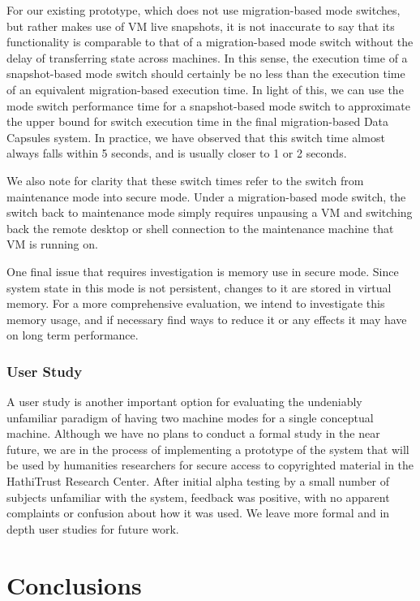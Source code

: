 \documentclass{acm_proc_article-sp}
\begin{document}
For our existing prototype, which does not use migration-based mode switches,
but rather makes use of VM live snapshots, it is not inaccurate to say that its
functionality is comparable to that of a migration-based mode switch without the
delay of transferring state across machines.  In this sense, the execution time
of a snapshot-based mode switch should certainly be no less than the execution
time of an equivalent migration-based execution time.  In light of this, we can
use the mode switch performance time for a snapshot-based mode switch to
approximate the upper bound for switch execution time in the final
migration-based Data Capsules system.  In practice, we have observed that this
switch time almost always falls within 5 seconds, and is usually closer to 1 or
2 seconds.

We also note for clarity that these switch times refer to the switch from
maintenance mode into secure mode.  Under a migration-based mode switch, the
switch back to maintenance mode simply requires unpausing a VM and switching
back the remote desktop or shell connection to the maintenance machine that VM
is running on.

One final issue that requires investigation is memory use in secure mode.  Since
system state in this mode is not persistent, changes to it are stored in virtual
memory.  For a more comprehensive evaluation, we intend to investigate this
memory usage, and if necessary find ways to reduce it or any effects it may have
on long term performance.

\subsubsection{User Study}

A user study is another important option for evaluating the undeniably
unfamiliar paradigm of having two machine modes for a single conceptual
machine.  Although we have no plans to conduct a formal study in the near
future, we are in the process of implementing a prototype of the system that
will be used by humanities researchers for secure access to copyrighted
material in the HathiTrust Research Center.  After initial alpha testing by a
small number of subjects unfamiliar with the system, feedback was positive,
with no apparent complaints or confusion about how it was used.  We leave more
formal and in depth user studies for future work.

\section{Conclusions}
\end{document}
